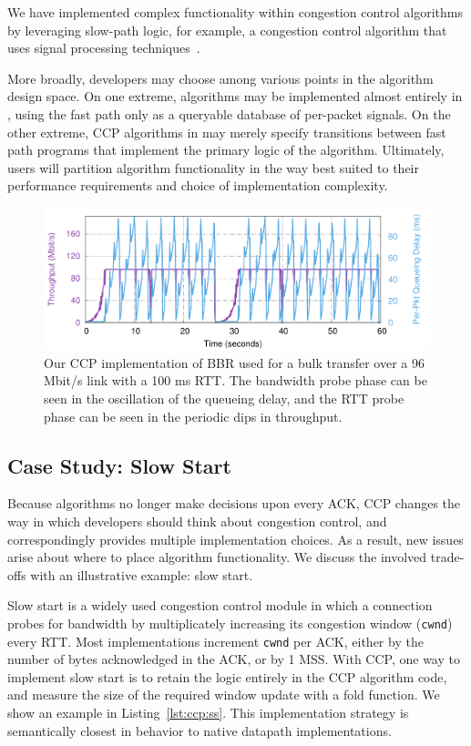 We have implemented complex functionality within congestion control algorithms
by leveraging slow-path logic, for example, a congestion control
algorithm that uses signal processing techniques~\cite{nimbus}.

More broadly, developers may choose among various points in the algorithm design
space.
On one extreme, algorithms may be implemented almost entirely in \userspace,
using the fast path only as a queryable database of per-packet signals.
On the other extreme, CCP algorithms in \userspace may merely specify
transitions between fast path programs that implement the primary logic of the
algorithm.
Ultimately, users will partition algorithm functionality in the way
best suited to their performance requirements and choice of implementation complexity.

\begin{figure}[t]
\centering
    \includegraphics[width=\columnwidth]{img/bbr}
    \caption{
    Our CCP implementation of BBR used for a bulk transfer over a 96 Mbit/s link with a 100 ms RTT. The bandwidth probe phase can be seen in the oscillation of the queueing delay, and the RTT probe phase can be seen in the periodic dips in throughput.
    }\label{fig:ccp:bbr}
\end{figure}

\subsection{Case Study: Slow Start}
\label{s:ccp:semantics}

Because algorithms no longer make decisions upon every ACK, CCP changes the way in which developers should think about congestion control, and correspondingly provides multiple implementation choices. As a result, new issues arise about where to place algorithm functionality. We discuss the involved trade-offs with an illustrative example: slow start.

Slow start is a widely used congestion control module in which a connection probes for bandwidth by multiplicately increasing its congestion window (\texttt{cwnd}) every RTT. Most implementations increment \texttt{cwnd} per ACK, either by the number of bytes acknowledged in the ACK, or by 1 MSS. With CCP, one way to implement slow start is to retain the logic entirely in the CCP algorithm code, and measure the size of the required window update with a fold function. We show an example in Listing~\ref{lst:ccp:ss}. This implementation strategy is semantically closest in behavior to native datapath implementations.

